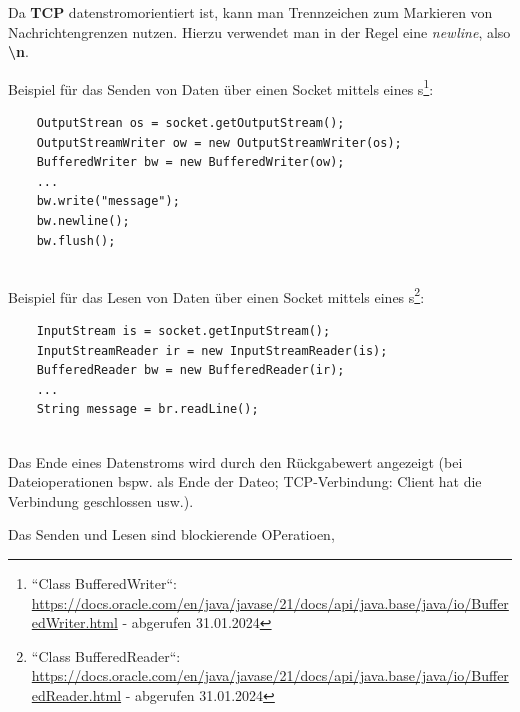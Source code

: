 \noindent
Da \textbf{TCP} datenstromorientiert ist, kann man Trennzeichen zum Markieren von Nachrichtengrenzen nutzen.
Hierzu verwendet man in der Regel eine \textit{newline}, also \textbf{\textbackslash n}.

Beispiel für das Senden von Daten über einen Socket mittels eines s\footnote{
    ``Class BufferedWriter``: \url{https://docs.oracle.com/en/java/javase/21/docs/api/java.base/java/io/BufferedWriter.html} - abgerufen 31.01.2024
}:
\begin{verbatim}
    OutputStrean os = socket.getOutputStream();
    OutputStreamWriter ow = new OutputStreamWriter(os);
    BufferedWriter bw = new BufferedWriter(ow);
    ...
    bw.write("message");
    bw.newline();
    bw.flush();
\end{verbatim}\\

Beispiel für das Lesen von Daten über einen Socket mittels eines s\footnote{
    ``Class BufferedReader``: \url{https://docs.oracle.com/en/java/javase/21/docs/api/java.base/java/io/BufferedReader.html} - abgerufen 31.01.2024
}:
\begin{verbatim}
    InputStream is = socket.getInputStream();
    InputStreamReader ir = new InputStreamReader(is);
    BufferedReader bw = new BufferedReader(ir);
    ...
    String message = br.readLine();
\end{verbatim}\\

\noindent
Das Ende eines Datenstroms wird durch den Rückgabewert  angezeigt (bei Dateioperationen bspw. als Ende der Dateo; TCP-Verbindung: Client hat die Verbindung geschlossen usw.).\\

\begin{tcolorbox}
    Das Senden und Lesen sind blockierende OPeratioen,
\end{tcolorbox}